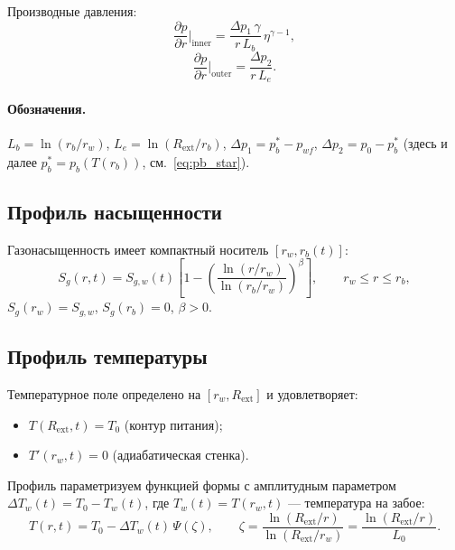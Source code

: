 \documentclass[12pt,a4paper]{article}
\newcommand{\pp}{\partial}
\newcommand{\ext}{\mathrm{ext}}
\begin{document}
Производные давления:
\begin{equation}\label{eq:dp_inner}
  \frac{\pp p}{\pp r}\bigg|_\text{inner}
  = \frac{\Delta p_1\,\gamma}{r\,L_b}\,\eta^{\gamma-1},
\end{equation}
\begin{equation}\label{eq:dp_outer}
  \frac{\pp p}{\pp r}\bigg|_\text{outer}
  = \frac{\Delta p_2}{r\,L_e}.
\end{equation}

\paragraph{Обозначения.}
$L_b = \ln(r_b/r_w)$, $L_e = \ln(R_\ext/r_b)$,
$\Delta p_1 = p_b^* - p_{wf}$, $\Delta p_2 = p_0 - p_b^*$
(здесь и далее $p_b^* = p_b(T(r_b))$, см.~\eqref{eq:pb_star}).


\subsection{Профиль насыщенности}

Газонасыщенность имеет компактный носитель $[r_w, r_b(t)]$:
\begin{equation}\label{eq:Sg_profile}
  S_g(r,t) = S_{g,w}(t)\!\left[
    1 - \left(\frac{\ln(r/r_w)}{\ln(r_b/r_w)}\right)^{\!\beta}
  \right],
  \qquad r_w \leqslant r \leqslant r_b,
\end{equation}
$S_g(r_w) = S_{g,w}$, $S_g(r_b) = 0$, $\beta > 0$.


\subsection{Профиль температуры}\label{ssec:T_profile}

Температурное поле определено на $[r_w, R_\ext]$ и удовлетворяет:
\begin{itemize}[nosep]
  \item $T(R_\ext, t) = T_0$ (контур питания);
  \item $T'(r_w, t) = 0$ (адиабатическая стенка).
\end{itemize}

Профиль параметризуем функцией формы
с амплитудным параметром $\Delta T_w(t) = T_0 - T_w(t)$,
где $T_w(t) = T(r_w, t)$ --- температура на забое:
\begin{equation}\label{eq:T_profile}
  T(r,t) = T_0 - \Delta T_w(t)\,\Psi(\zeta),
  \qquad
  \zeta = \frac{\ln(R_\ext/r)}{\ln(R_\ext/r_w)} = \frac{\ln(R_\ext/r)}{L_0}.
\end{equation}
\end{document}
